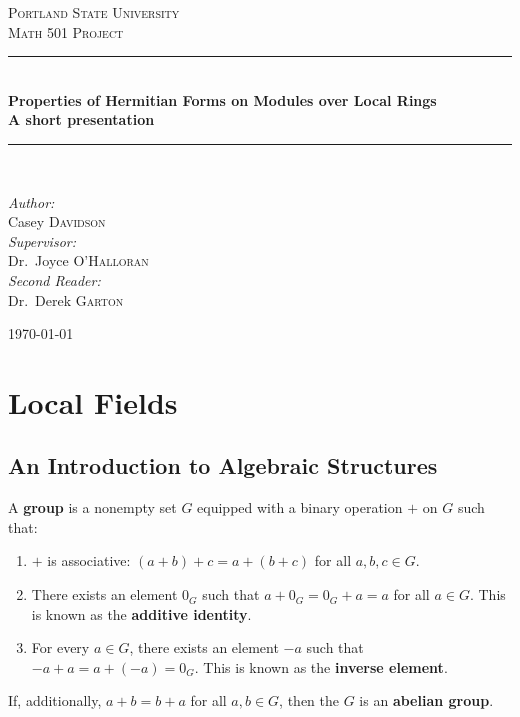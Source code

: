 \documentclass[11pt]{article}
\begin{document}
\begin{titlepage}
\begin{center}

\textsc{\LARGE Portland State University}\\[1.5cm]

\textsc{\Large Math 501 Project}\\[0.5cm]

\hrule ~\\[0.4cm]
{ \large \bfseries Properties of Hermitian Forms on Modules over Local Rings \\ }
{ \bfseries A short presentation \\[0.4cm] }

\hrule ~\\[0.75cm]

\begin{center}
\emph{Author:}\\
Casey \textsc{Davidson}\\[1cm]

\emph{Supervisor:}\\
Dr.~Joyce \textsc{O'Halloran}\\[1cm]

\emph{Second Reader:}\\
Dr.~Derek \textsc{Garton}
\end{center}

\vfill

{\large \today}

\end{center}
\end{titlepage}

\section*{Local Fields}
\subsection*{An Introduction to Algebraic Structures}

\begin{definition*}
A \textbf{group} is a nonempty set $G$ equipped with a binary operation $+$ on $G$ such that:
\begin{enumerate}
\item $+$ is associative: $(a + b) + c = a + (b + c)$ for all $a, b, c \in G$.
\item There exists an element $0_G$ such that $a + 0_G = 0_G + a = a$ for all $a \in G$. 
This is known as the \textbf{additive identity}.
\item For every $a \in G$, there exists an element $-a$ such that $-a + a = a + (-a) = 0_G$.
This is known as the \textbf{inverse element}.
\end{enumerate}
If, additionally, $a + b = b + a$ for all $a, b \in G$, then the $G$ is an \textbf{abelian group}.
\end{definition*}
\end{document}
